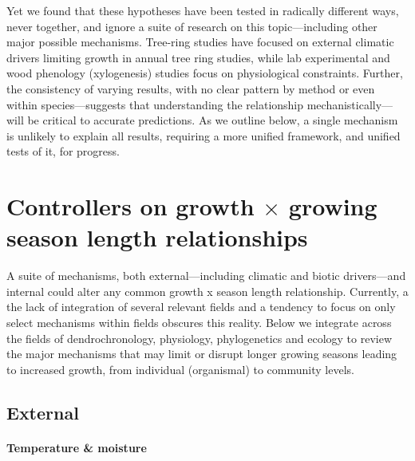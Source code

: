 \documentclass[11pt]{article}
\begin{document}
Yet we found that these hypotheses have been tested in radically different ways, never together, and ignore a suite of research on this topic---including other major possible mechanisms. Tree-ring studies have focused on external climatic drivers limiting growth in annual tree ring studies, while lab experimental and wood phenology (xylogenesis) studies focus on physiological constraints. Further, the consistency of varying results, with no clear pattern by method or even within species---suggests that understanding the relationship mechanistically---will be critical to accurate predictions. As we outline below, a single mechanism is unlikely to explain all results, requiring a more unified framework, and unified tests of it, for progress. 
 
\section*{Controllers on growth $\times$ growing season length relationships}

A suite of mechanisms, both external---including climatic and biotic drivers---and internal could alter any common growth x season length relationship. Currently, a the lack of integration of several relevant fields and a tendency to focus on only select mechanisms within fields obscures this reality. Below we integrate across the fields of dendrochronology, physiology, phylogenetics and ecology to review the major mechanisms that may limit or disrupt longer growing seasons leading to increased growth, from individual (organismal) to community levels. 

\subsection*{External}

\paragraph{Temperature \& moisture} %
\end{document}
